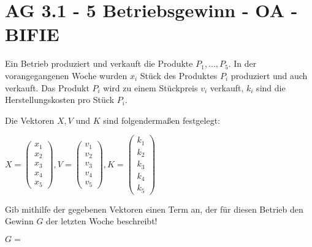 \section{AG 3.1 - 5 Betriebsgewinn - OA - BIFIE}

\begin{beispiel}[AG 3.1]{1} %
Ein Betrieb produziert und verkauft die Produkte $P_{1}, ..., P_{5}$. In der vorangegangenen Woche wurden $x_{i}$ Stück des Produktes $P_{i}$ produziert und auch verkauft. Das Produkt $P_{i}$ wird zu einem Stückpreis $v_{i}$ verkauft, $k_{i}$ sind die Herstellungskosten pro Stück $P_{i}$.

Die Vektoren $X,V$ und $K$ sind folgendermaßen festgelegt:
\leer

\begin{center}
$X=\left(\begin{array}{r}x_1\\x_2\\x_3\\x_4\\x_5\end{array}\right), V=\left(\begin{array}{r}v_1\\v_2\\v_3\\v_4\\v_5\end{array}\right), K=\left(\begin{array}{r}k_1\\k_2\\k_3\\k_4\\k_5\end{array}\right)$
\end{center}

Gib mithilfe der gegebenen Vektoren einen Term an, der für diesen Betrieb den Gewinn $G$ der letzten Woche beschreibt!
\leer

$G=$ 
\end{beispiel}